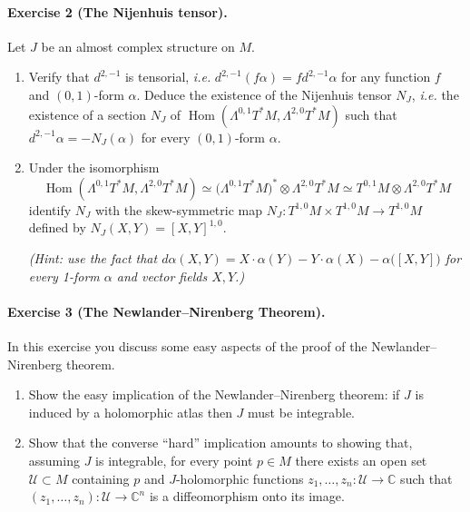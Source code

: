 \documentclass{article}
\theoremstyle{definition}
\DeclareMathOperator{\Hom}{Hom}
\newcommand{\U}{\mathcal{U}}
\newcommand{\C}{\mathbb{C}}
\begin{document}
\paragraph{Exercise 2 {\normalfont(The Nijenhuis tensor)}.} Let $J$ be an almost
complex structure on $M$.
\begin{enumerate}[label=(\roman*)]
    \item Verify that $d^{2,-1}$ is tensorial, \emph{i.e.}
        $d^{2,-1}(f\alpha)=fd^{2,-1}\alpha$ for any function $f$ and
        $(0,1)$-form $\alpha$. Deduce the existence of the Nijenhuis tensor
        $N_J$, \emph{i.e.} the existence of a section $N_J$ of
        $\Hom(\Lambda^{0,1}T^*M,\Lambda^{2,0}T^*M)$ such that
        $d^{2,-1}\alpha=-N_J(\alpha)$ for every $(0,1)$-form $\alpha$.

    \item Under the isomorphism
        \begin{equation*}
            \Hom(\Lambda^{0,1}T^*M,\Lambda^{2,0}T^*M)
                \simeq \bigl(\Lambda^{0,1}T^*M\bigr)^*\otimes\Lambda^{2,0}T^*M
                \simeq T^{0,1}M\otimes\Lambda^{2,0}T^*M
        \end{equation*}
        identify $N_J$ with the skew-symmetric map
        $N_J:T^{1,0}M\times T^{1,0}M\to T^{1,0}M$ defined by
        $N_J(X,Y)=[X,Y]^{1,0}$.

        \textit{(Hint: use the fact that
        $d\alpha(X,Y)=X\cdot\alpha(Y)-Y\cdot\alpha(X)-\alpha\bigl([X,Y]\bigr)$
        for every 1-form $\alpha$ and vector fields $X,Y$.)}
\end{enumerate}

\paragraph{Exercise 3 {\normalfont(The Newlander--Nirenberg Theorem)}.} In this
exercise you discuss some easy aspects of the proof of the Newlander--Nirenberg
theorem.
\begin{enumerate}[label=(\roman*)]
    \item Show the easy implication of the Newlander--Nirenberg theorem: if $J$
        is induced by a holomorphic atlas then $J$ must be integrable.

    \item Show that the converse ``hard'' implication amounts to showing that,
        assuming $J$ is integrable, for every point $p\in M$ there exists an
        open set $\U\subset M$ containing $p$ and $J$-holomorphic functions
        $z_1,\ldots,z_n:\U\to\C$ such that $(z_1,\ldots,z_n):\U\to\C^n$ is a
        diffeomorphism onto its image.
\end{enumerate}
\end{document}
